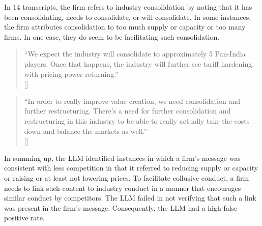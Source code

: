 In 14 transcripts, the firm refers to industry consolidation by noting that it has been consolidating, needs to consolidate, or will consolidate. In some instances, the firm attributes consolidation to too much supply or capacity or too many firms. In one case, they do seem to be facilitating such consolidation.

\begin{quote}
``We expect the industry will consolidate to approximately 5 Pan-India players. Once that happens, the industry will further see tariff hardening, with pricing power returning.'' \\
\mbox{[]}
\end{quote}

\begin{quote}
``In order to really improve value creation, we need consolidation and further restructuring. There’s a need for further consolidation and restructuring in this industry to be able to really actually take the costs down and balance the markets as well.'' \\
\mbox{[]}
\end{quote}

In summing up, the LLM identified instances in which a firm’s message was consistent with less competition in that it referred to reducing supply or capacity or raising or at least not lowering prices. To facilitate collusive conduct, a firm needs to link such content to industry conduct in a manner that encourages similar conduct by competitors. The LLM failed in not verifying that such a link was present in the firm’s message. Consequently, the LLM had a high false positive rate.
